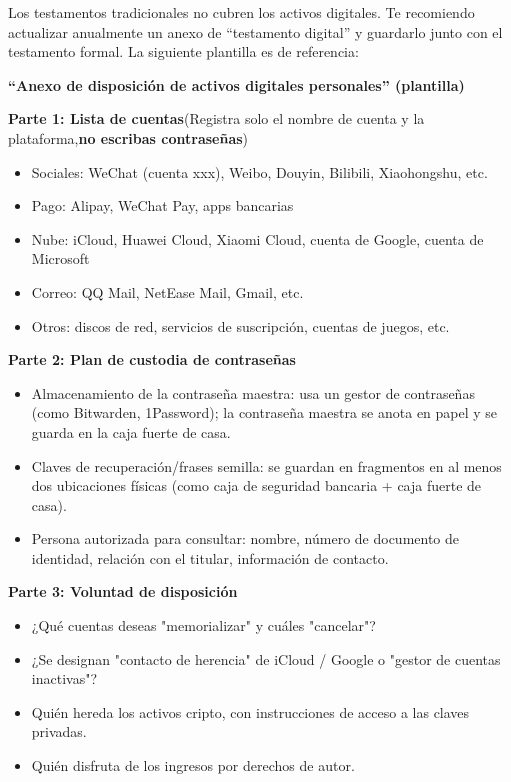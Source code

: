 
Los testamentos tradicionales no cubren los activos digitales. Te recomiendo actualizar anualmente un anexo de “testamento digital” y guardarlo junto con el testamento formal. La siguiente plantilla es de referencia:

\textbf{“Anexo de disposición de activos digitales personales” (plantilla)}\par

\textbf{Parte 1: Lista de cuentas}(Registra solo el nombre de cuenta y la plataforma,\textbf{no escribas contraseñas})

\begin{itemize}
  \item Sociales: WeChat (cuenta xxx), Weibo, Douyin, Bilibili, Xiaohongshu, etc.
  \item Pago: Alipay, WeChat Pay, apps bancarias
  \item Nube: iCloud, Huawei Cloud, Xiaomi Cloud, cuenta de Google, cuenta de Microsoft
  \item Correo: QQ Mail, NetEase Mail, Gmail, etc.
  \item Otros: discos de red, servicios de suscripción, cuentas de juegos, etc.
\end{itemize}

\textbf{Parte 2: Plan de custodia de contraseñas}

\begin{itemize}
  \item Almacenamiento de la contraseña maestra: usa un gestor de contraseñas (como Bitwarden, 1Password); la contraseña maestra se anota en papel y se guarda en la caja fuerte de casa.
  \item Claves de recuperación/frases semilla: se guardan en fragmentos en al menos dos ubicaciones físicas (como caja de seguridad bancaria + caja fuerte de casa).
  \item Persona autorizada para consultar: nombre, número de documento de identidad, relación con el titular, información de contacto.
\end{itemize}

\textbf{Parte 3: Voluntad de disposición}

\begin{itemize}
  \item ¿Qué cuentas deseas "memorializar" y cuáles "cancelar"?
  \item ¿Se designan "contacto de herencia" de iCloud / Google o "gestor de cuentas inactivas"?
  \item Quién hereda los activos cripto, con instrucciones de acceso a las claves privadas.
  \item Quién disfruta de los ingresos por derechos de autor.
\end{itemize}

